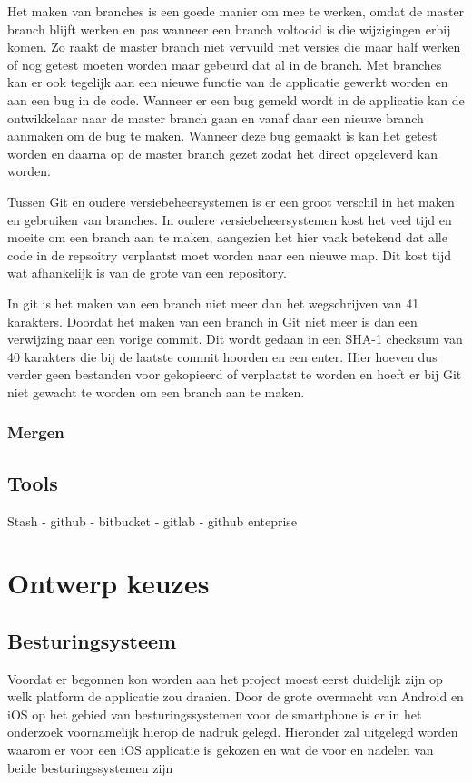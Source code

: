\documentclass[a4paper,11pt,oneside]{report}
\begin{document}
Het maken van branches is een goede manier om mee te werken, omdat de master branch blijft werken en pas wanneer een branch voltooid is die wijzigingen erbij komen. Zo raakt de master branch niet vervuild met versies die maar half werken of nog getest moeten worden maar gebeurd dat al in de branch. Met branches kan er ook tegelijk aan een nieuwe functie van de applicatie gewerkt worden en aan een bug in de code. Wanneer er een bug gemeld wordt in de applicatie kan de ontwikkelaar naar de master branch gaan en vanaf daar een nieuwe branch aanmaken om de bug te maken. Wanneer deze bug gemaakt is kan het getest worden en daarna op de master branch gezet zodat het direct opgeleverd kan worden.

Tussen Git en oudere versiebeheersystemen is er een groot verschil in het maken en gebruiken van branches. In oudere versiebeheersystemen kost het veel tijd en moeite om een branch aan te maken, aangezien het hier vaak betekend dat alle code in de repsoitry verplaatst moet worden naar een nieuwe map. Dit kost tijd wat afhankelijk is van de grote van een repository.

In git is het maken van een branch niet meer dan het wegschrijven van 41 karakters. Doordat het maken van een branch in Git niet meer is dan een verwijzing naar een vorige commit. Dit wordt gedaan in een SHA-1 checksum van 40 karakters die bij de laatste commit hoorden en een enter. Hier hoeven dus verder geen bestanden voor gekopieerd of verplaatst te worden en hoeft er bij Git niet gewacht te worden om een branch aan te maken.

\subsection{Mergen}



\section{Tools}
Stash - github - bitbucket - gitlab - github enteprise


\chapter{Ontwerp keuzes}

\section{Besturingsysteem}
Voordat er begonnen kon worden aan het project moest eerst duidelijk zijn op welk platform de applicatie zou draaien. Door de grote overmacht van Android en iOS op het gebied van besturingssystemen voor de smartphone is er in het onderzoek voornamelijk hierop de nadruk gelegd. Hieronder zal uitgelegd worden waarom er voor een iOS applicatie is gekozen en wat de voor en nadelen van beide besturingssystemen zijn
\end{document}
